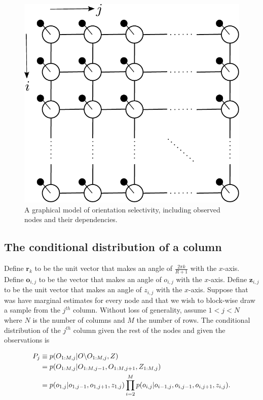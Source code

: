 \documentclass[11pt]{article}
\begin{document}
\begin{figure}[h]
\centering
\includegraphics[scale=0.50]{../fig/col_grid_gm_obs}
\caption{A graphical model of orientation selectivity, including observed nodes and their dependencies.}
\label{fig:som_gm2}
\end{figure}

\subsection{The conditional distribution of a column}

Define $\mathbf{r}_k$ to be the unit vector that makes an angle of $\frac{2\pi k}{R+1}$ with the $x$-axis. Define $\mathbf{o}_{i,j}$ to be the vector that makes an angle of $o_{i,j}$ with the $x$-axis. Define $\mathbf{z}_{i,j}$ to be the unit vector that makes an angle of $z_{i,j}$ with the $x$-axis. Suppose that was have marginal estimates for every node and that we wish to block-wise draw a sample from the $j^{th}$ column. Without loss of generality, assume $1<j<N$ where $N$ is the number of columns and $M$ the number of rows. The conditional distribution of the $j^{th}$ column given the rest of the nodes and given the observations is

\begin{align}
P_j &\equiv p(O_{1:M,j}|O\backslash O_{1:M,j},Z) \\
&= p(O_{1:M,j}|O_{1:M,j-1},O_{1:M,j+1},Z_{1:M,j}) \notag \\
&= p(o_{1,j}|o_{1,j-1},o_{1,j+1},z_{1,j}) \prod_{i=2}^M p(o_{i,j}|o_{i-1,j},o_{i,j-1},o_{i,j+1},z_{i,j}). \notag
\end{align}
\end{document}
